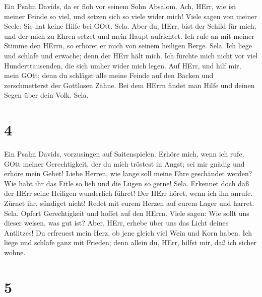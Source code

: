  Ein Psalm Davids, da er floh vor seinem Sohn Absalom.
 Ach, HErr, wie ist meiner Feinde so viel, und setzen sich
so viele wider mich!  Viele sagen von meiner Seele: Sie hat
keine Hilfe bei GOtt. Sela.  Aber du, HErr, bist der Schild
für mich, und der mich zu Ehren setzet und mein Haupt aufrichtet.
 Ich rufe an mit meiner Stimme den HErrn, so erhöret er mich
von seinem heiligen Berge. Sela.  Ich liege und schlafe und
erwache; denn der HErr hält mich.  Ich fürchte mich nicht
vor viel Hunderttausenden, die sich umher wider mich legen. 
Auf HErr, und hilf mir, mein GOtt; denn du schlägst alle meine Feinde
auf den Backen und zerschmetterst der Gottlosen Zähne.  Bei
dem HErrn findet man Hilfe und deinen Segen über dein Volk. Sela.

\hypertarget{section-3}{%
\section{4}\label{section-3}}

 Ein Psalm Davids, vorzusingen auf Saitenspielen.
 Erhöre mich, wenn ich rufe, GOtt meiner Gerechtigkeit, der
du mich tröstest in Angst; sei mir gnädig und erhöre mein Gebet!
 Liebe Herren, wie lange soll meine Ehre geschändet werden?
Wie habt ihr das Eitle so lieb und die Lügen so gerne! Sela.
 Erkennet doch daß der HErr seine Heiligen wunderlich
führet! Der HErr höret, wenn ich ihn anrufe.  Zürnet ihr,
sündiget nicht! Redet mit eurem Herzen auf eurem Lager und harret. Sela.
 Opfert Gerechtigkeit und hoffet auf den HErrn. 
Viele sagen: Wie sollt uns dieser weisen, was gut ist? Aber, HErr,
erhebe über uns das Licht deines Antlitzes!  Du erfreuest
mein Herz, ob jene gleich viel Wein und Korn haben.  Ich
liege und schlafe ganz mit Frieden; denn allein du, HErr, hilfst mir,
daß ich sicher wohne.

\hypertarget{section-4}{%
\section{5}\label{section-4}}

